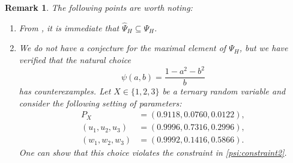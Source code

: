 \documentclass[conference,letterpaper,onecolumn]{IEEEtran}
\theoremstyle{plain}%
\newtheorem{rem}{Remark}
\begin{document}
\begin{rem}
    \label{rem:hel2}
    The following points are worth noting:
    \begin{enumerate}
        \item From , it is immediate that $\hat{\Psi}_H \subseteq \Psi_H$.
        \item We do not have a conjecture for the maximal element of $\Psi_H$, but we have verified that the natural choice
$$\psi(a,b)=\frac{1-a^2-b^2}{b}$$
has counterexamples. Let $X\in\{1,2,3\}$ be a ternary random variable and consider the following setting of parameters:
\begin{align*}P_X &= (0.9118,0.0760,0.0122),\\
(u_1,u_2,u_3) &= (0.9996,0.7316,0.2996),\\
(w_1, w_2, w_3) &= (0.9992,0.1416,0.5866).
\end{align*} 
One can show that this choice violates the constraint in \eqref{psi:constraint2}.
    \end{enumerate}
\end{rem}
\end{document}
